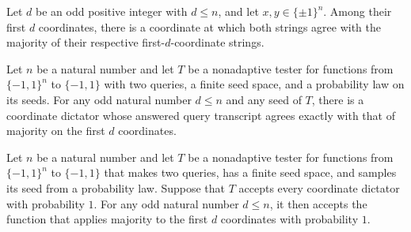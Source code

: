 \begin{theorem}
\label{FABL.exists_common_majorityAgreementCoordinate}
\leanok
{}
Let $d$ be an odd positive integer with $d\le n$, and let $x,y\in\{\pm1\}^n$. Among
their first $d$ coordinates, there is a coordinate at which both strings agree with the
majority of their respective first-$d$-coordinate strings.
\end{theorem}

\begin{theorem}
\label{FABL.twoQuery_embeddedMajority_transcript_eq_dictator}
\leanok
{}
Let $n$ be a natural number and let $T$ be a nonadaptive tester for functions from
$\{-1,1\}^n$ to $\{-1,1\}$ with two queries, a finite seed space, and a probability law
on its seeds. For any odd natural number $d\le n$ and any seed of $T$, there is a
coordinate dictator whose answered query transcript agrees exactly with that of majority
on the first $d$ coordinates.
\end{theorem}

\begin{theorem}
\label{FABL.twoQueryTester_accepts_embeddedOddMajority}
\leanok
{}
Let $n$ be a natural number and let $T$ be a nonadaptive tester for functions from
$\{-1,1\}^n$ to $\{-1,1\}$ that makes two queries, has a finite seed space, and samples
its seed from a probability law. Suppose that $T$ accepts every coordinate dictator with
probability $1$. For any odd natural number $d\le n$, it then accepts the function that
applies majority to the first $d$ coordinates with probability $1$.
\end{theorem}

